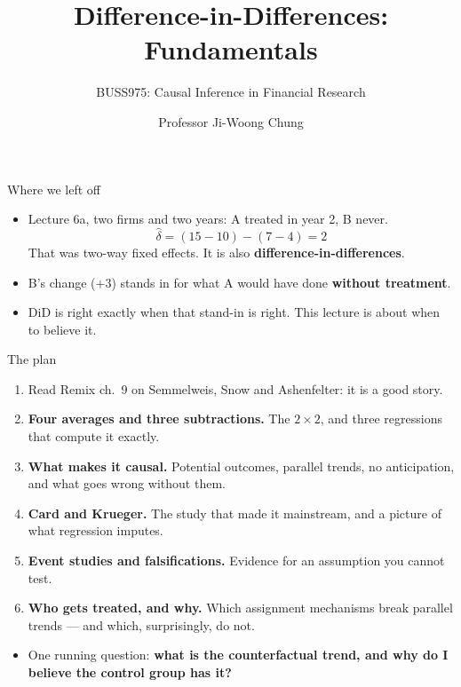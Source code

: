 \documentclass[
  11pt,
  ignorenonframetext,
  aspectratio=169,
]{beamer}
\title{\texorpdfstring{Difference-in-Differences:
Fundamentals}{Difference-in-Differences: Fundamentals}}
\subtitle{\texorpdfstring{BUSS975: Causal Inference in Financial
Research}{BUSS975: Causal Inference in Financial Research}}
\author{Professor Ji-Woong Chung}
\date{}
\institute{Korea University}
\providecommand{\tightlist}{%
  \setlength{\itemsep}{0pt}\setlength{\parskip}{0pt}}
\begin{document}
\frame{\titlepage}


\begin{frame}{Where we left off}
\protect{}\label{where-we-left-off}
\begin{itemize}
\tightlist
\item
  Lecture 6a, two firms and two years: A treated in year 2, B never. \[
  \hat\delta = (15 - 10) - (7 - 4) = 2
  \] That was two-way fixed effects. It is also
  \textbf{difference-in-differences}.
\end{itemize}

\vspace{0.6em}

\begin{itemize}
\tightlist
\item
  B's change (\(+3\)) stands in for what A would have done
  \textbf{without treatment}.
\item
  DiD is right exactly when that stand-in is right. This lecture is
  about when to believe it.
\end{itemize}
\end{frame}

\begin{frame}{The plan}
\protect{}\label{the-plan}
\begin{enumerate}
\tightlist
\item
  Read Remix ch.~9 on Semmelweis, Snow and Ashenfelter: it is a good
  story.
\item
  \textbf{Four averages and three subtractions.} The \(2 \times 2\), and
  three regressions that compute it exactly.
\item
  \textbf{What makes it causal.} Potential outcomes, parallel trends, no
  anticipation, and what goes wrong without them.
\item
  \textbf{Card and Krueger.} The study that made it mainstream, and a
  picture of what regression imputes.
\item
  \textbf{Event studies and falsifications.} Evidence for an assumption
  you cannot test.
\item
  \textbf{Who gets treated, and why.} Which assignment mechanisms break
  parallel trends --- and which, surprisingly, do not.
\end{enumerate}

\vspace{0.4em}

\begin{itemize}
\tightlist
\item
  One running question: \textbf{what is the counterfactual trend, and
  why do I believe the control group has it?}
\end{itemize}
\end{frame}
\end{document}
